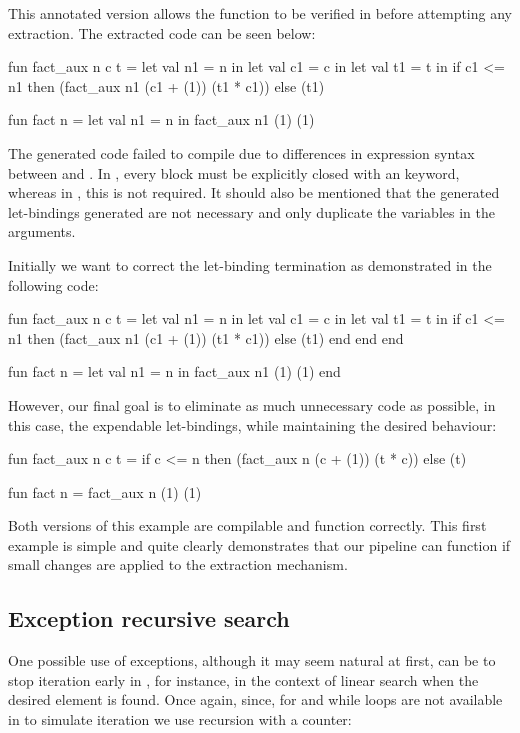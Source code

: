 This annotated version allows the function to be verified in \whythree before attempting any extraction. The extracted code can be
seen below:

\begin{cakeml}
fun fact_aux n c t = let val n1 = n in
  let val c1 = c in
  let val t1 = t in
  if c1 <= n1 then (fact_aux n1 (c1 + (1)) (t1 * c1))  else (t1)

fun fact n = let val n1 = n in fact_aux n1 (1) (1)
\end{cakeml}

The generated \cml code failed to compile due to differences in  expression syntax between \ocaml and \cml. In \cml, every 
 block must be explicitly closed with an  keyword, whereas in \ocaml, this is not required. It should
also be mentioned that the generated let-bindings generated are not necessary and only duplicate the variables in the arguments.

Initially we want to correct the let-binding termination as demonstrated in the following code:

\begin{cakeml}
fun fact_aux n c t = let val n1 = n in
  let val c1 = c in
  let val t1 = t in
  if c1 <= n1 then (fact_aux n1 (c1 + (1)) (t1 * c1))  else (t1)
  end end end

fun fact n = let val n1 = n in fact_aux n1 (1) (1) end
\end{cakeml}

However, our final goal is to eliminate as much unnecessary code as possible, in this case, the expendable let-bindings, while 
maintaining the desired behaviour:

\begin{cakeml}
fun fact_aux n c t = 
  if c <= n then (fact_aux n (c + (1)) (t * c))  else (t)

fun fact n = fact_aux n (1) (1)
\end{cakeml}

Both versions of this example are compilable and function correctly. This first example is simple and quite clearly demonstrates that
our pipeline can function if small changes are applied to the extraction mechanism.

\subsection{Exception recursive search}

One possible use of exceptions, although it may seem natural at first, can be to stop iteration early in \ocaml, for instance, in the 
context of linear search when the desired element is found. Once again, since, for and while loops are not available in \cml to simulate 
iteration we use recursion with a counter:

